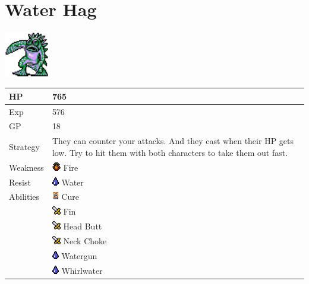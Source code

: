 \section{Water Hag}
\label{monster:water_hag}

\includegraphics[height=2cm,keepaspectratio]{./resources/monster/water_hag}

\begin{longtable}{ l p{9cm} }
	HP
	& 765
\\ \hline
	Exp
	& 576
\\ \hline
	GP
	& 18
\\ \hline
	Strategy
	& They can counter your attacks. And they cast \nameref{spell:cure} when their HP gets low. Try to hit them with both characters to take them out fast.
\\ \hline
	Weakness
	& \includegraphics[height=1em,keepaspectratio]{./resources/effects/fire} Fire
\\ \hline
	Resist
	& \includegraphics[height=1em,keepaspectratio]{./resources/effects/water} Water
\\ \hline
	Abilities
	& \includegraphics[height=1em,keepaspectratio]{./resources/spells/cure} Cure \\
	& \includegraphics[height=1em,keepaspectratio]{./resources/effects/damage} Fin \\
	& \includegraphics[height=1em,keepaspectratio]{./resources/effects/damage} Head Butt \\
	& \includegraphics[height=1em,keepaspectratio]{./resources/effects/damage} Neck Choke \\
	& \includegraphics[height=1em,keepaspectratio]{./resources/effects/water} Watergun \\
	& \includegraphics[height=1em,keepaspectratio]{./resources/effects/water} Whirlwater
\end{longtable}
